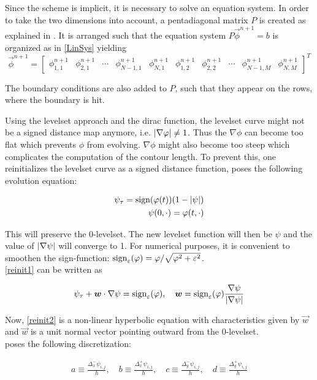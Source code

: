 Since the scheme is implicit, it is necessary to solve an equation system. In order to take the two dimensions into account, a pentadiagonal matrix $P$ is created as explained in \cite{holm.07}. It is arranged such that the equation system $P\vec{\phi}^{n+1} = b$ is organized as in \eqref{LinSys} yielding
\[
\vec{\phi}^{n+1} = 
\begin{bmatrix}
  \phi_{1,1}^{n+1} & \phi_{2,1}^{n+1} & \cdots & \phi_{N-1,1}^{n+1} & \phi_{N,1}^{n+1} & \phi_{1,2}^{n+1} & \phi_{2,2}^{n+1} & \cdots 
  & \phi_{N-1,M}^{n+1} & \phi_{N,M}^{n+1}
\end{bmatrix}^T
\]

The boundary conditions are also added to $P$, such that they appear on the rows, where the boundary is hit.

Using the levelset approach and the dirac function, the levelset curve might not be a signed distance map anymore, i.e. $\left| {\nabla \varphi} \right|\neq 1$. Thus the $\nabla\phi$ can become too flat which prevents $\phi$ from evolving. $\nabla\phi$ might also become too steep which complicates the computation of the contour length. To prevent this, one reinitializes the levelset curve as a signed distance function, \cite{suss.94} poses the following evolution equation:

\begin{align}
\psi_\tau = \sign(\phi(t))(1-\abs{\psi})\label{reinit1}\\
\psi(0,\cdot) = \phi(t,\cdot)
\end{align}

This will preserve the 0-levelset. The new levelset function will then be $\psi$ and the value of $\left| {\nabla \psi} \right|$ will converge to 1.
For numerical purposes, it is convenient to smoothen the sign-function: ${\rm sign}_\varepsilon(\varphi) = \varphi/\sqrt{\varphi^2+\varepsilon^2}$.\\
\eqref{reinit1} can be written as

\begin{equation}
\psi_\tau + \vec{w}\cdot\nabla\psi = \sign_\epsilon(\phi), \quad \vec{w} = \sign_\epsilon(\phi)\frac{\nabla\psi}{\abs{\nabla\psi}}\label{reinit2}
\end{equation}

Now, \eqref{reinit2} is a non-linear hyperbolic equation with characteristics given by $\vec{w}$ and $\vec{w}$ is a unit normal vector pointing outward from the 0-levelset.\\
\cite{suss.94} poses the following discretization:

\begin{align}
a \equiv \frac{\Delta_x^- \psi_{i,j}}{h},\quad b \equiv \frac{\Delta_x^+ \psi_{i,j}}{h},\quad c \equiv \frac{\Delta_y^- \psi_{i,j}}{h}, \quad d \equiv \frac{\Delta_y^+ \psi_{i,j}}{h} 
\end{align}

